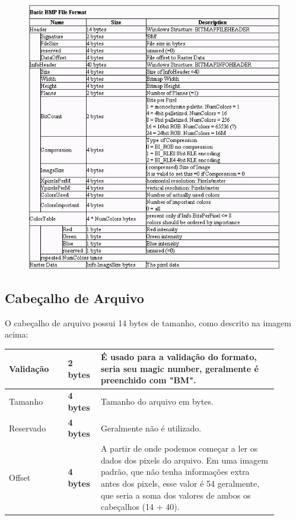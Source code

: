 \documentclass[a4paper,oneside,12pt]{article}
\begin{document}
\begin{figure}[ht]
    \centering
    \includegraphics[width=\linewidth]{media/bmp_header.png}
\end{figure}
\break

\subsection{Cabeçalho de Arquivo}

O cabeçalho de arquivo possui 14 bytes de tamanho, como descrito na imagem acima:

\begin{center}
\begin{tabular}{|p{0.2\linewidth}|p{0.1\linewidth}|p{0.6\linewidth}|}
    \hline
    Validação & \textbf{2 bytes} & É usado para a validação do formato, seria seu magic number, geralmente é preenchido com "BM".\\
    \hline
    Tamanho & \textbf{4 bytes} & Tamanho do arquivo em bytes.\\
    \hline
    Reservado & \textbf{4 bytes} & Geralmente não é utilizado.\\
    \hline
    Offset & \textbf{4 bytes} & A partir de onde podemos começar a ler os dados dos pixels do arquivo. Em uma imagem padrão, que não tenha informações extra antes dos pixels, esse valor é 54 geralmente, que seria a soma dos valores de ambos os cabeçalhos (14 + 40).\\
    \hline
\end{tabular}
\end{center}
\end{document}
